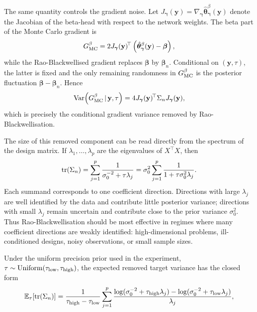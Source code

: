 The same quantity controls the gradient noise. Let
$J_{\bm{\gamma}}(\mathbf{y}) =
\nabla_{\bm{\gamma}}\hat{\bm{\theta}}_{\bm{\gamma}}^\beta(\mathbf{y})$
denote the Jacobian of the beta-head with respect to the network
weights. The beta part of the Monte Carlo gradient is
%
\begin{equation}
  G_{\mathrm{MC}}^{\beta}
  =
  2J_{\bm{\gamma}}(\mathbf{y})^{\!\top}
  \left(
  \hat{\bm{\theta}}_{\bm{\gamma}}^\beta(\mathbf{y})-\bm{\beta}
  \right),
\end{equation}
%
while the Rao-Blackwellised gradient replaces $\bm{\beta}$ by
$\bm{\beta}_n$. Conditional on $(\mathbf{y},\tau)$, the latter is
fixed and the only remaining randomness in $G_{\mathrm{MC}}^{\beta}$ is the
posterior fluctuation $\bm{\beta}-\bm{\beta}_n$. Hence
%
\begin{equation}
  \operatorname{Var}\!\left(
  G_{\mathrm{MC}}^{\beta}
  \,|\, \mathbf{y},\tau
  \right)
  =
  4J_{\bm{\gamma}}(\mathbf{y})^{\!\top}
  \Sigma_n
  J_{\bm{\gamma}}(\mathbf{y}),
  \label{eq:lr-gradient-cov-gap}
\end{equation}
%
which is precisely the conditional gradient variance removed by
Rao-Blackwellisation.

The size of this removed component can be read directly from the
spectrum of the design matrix. If
$\lambda_1,\ldots,\lambda_p$ are the eigenvalues of $X^{\!\top}X$, then
%
\begin{equation}
  \operatorname{tr}(\Sigma_n)
  =
  \sum_{j=1}^{p}
  \frac{1}{\sigma_0^{-2}+\tau\lambda_j}
  =
  \sigma_0^2
  \sum_{j=1}^{p}
  \frac{1}{1+\tau\sigma_0^2\lambda_j}.
  \label{eq:lr-trace-spectrum}
\end{equation}
%
Each summand corresponds to one coefficient direction. Directions with
large $\lambda_j$ are well identified by the data and contribute
little posterior variance; directions with small $\lambda_j$ remain
uncertain and contribute close to the prior variance $\sigma_0^2$.
Thus Rao-Blackwellisation should be most effective in regimes where
many coefficient directions are weakly identified: high-dimensional
problems, ill-conditioned designs, noisy observations, or small
sample sizes.

Under the uniform precision prior used in the experiment,
$\tau\sim\mathrm{Uniform}(\tau_{\mathrm{low}},\tau_{\mathrm{high}})$, the
expected removed target variance has the closed form
%
\begin{equation}
  \mathbb{E}_{\tau}\!\left[\operatorname{tr}(\Sigma_n)\right]
  =
  \frac{1}{\tau_{\mathrm{high}}-\tau_{\mathrm{low}}}
  \sum_{j=1}^{p}
  \frac{
  \log(\sigma_0^{-2}+\tau_{\mathrm{high}}\lambda_j)
  -
  \log(\sigma_0^{-2}+\tau_{\mathrm{low}}\lambda_j)
  }{\lambda_j},
  \label{eq:lr-expected-trace}
\end{equation}
%

